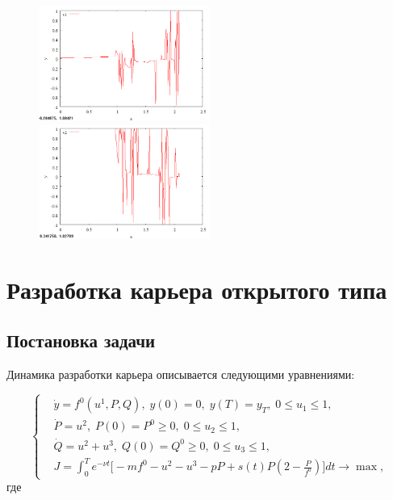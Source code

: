 \documentclass[14pt]{article}
\begin{document}
\begin{figure}
\begin{floatrow}
    {\includegraphics[width=0.5\textwidth]{task3_v1}}
    {\includegraphics[width=0.5\textwidth]{task3_v2}}
\end{floatrow}
\end{figure}


\newpage
\section{Разработка карьера открытого типа}
\subsection{Постановка задачи}

Динамика разработки карьера описывается следующими уравнениями:

\begin{equation}\label{syst4}
\left\{ \begin{aligned}
& \dot{y} = f^0(u^1,P,Q), \;  y(0)=0, \; y(T) = y_T, \; 0 \le u_1 \le 1, \\
& \dot{P} = u^2, \; P(0) = P^0 \ge 0, \; 0 \le u_2 \le 1,\\
& \dot{Q} = u^2+u^3, \; Q(0) = Q^0 \ge 0, \; 0 \le u_3 \le 1, \\
& J = \int_0^T e^{-\nu t} \Big[ -m f^0 - u^2 - u^3 - p P + s(t)P(2-\frac{P}{f^0}) \Big] dt \rightarrow \max,
\end{aligned}\right.
\end{equation}
где
\end{document}
